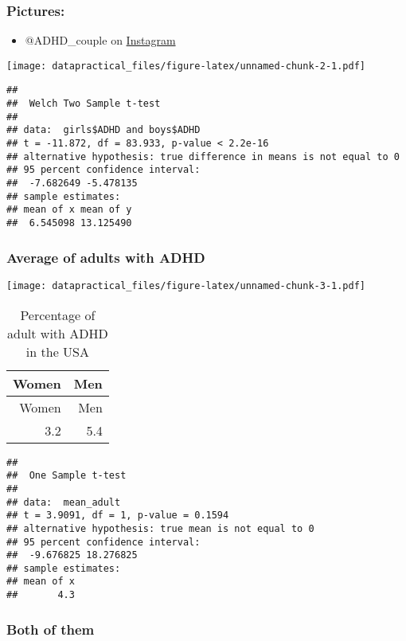 \documentclass[
]{article}
\providecommand{\tightlist}{%
  \setlength{\itemsep}{0pt}\setlength{\parskip}{0pt}}
\begin{document}
\hypertarget{pictures}{%
\subsubsection{Pictures:}\label{pictures}}

\begin{itemize}
\tightlist
\item
  @ADHD\_couple on
  \href{https://www.instagram.com/p/CF7aB2NDL3j/?hl=f}{Instagram}
\end{itemize}

\texttt{[image: datapractical\_files/figure-latex/unnamed-chunk-2-1.pdf]}

\begin{verbatim}
## 
##  Welch Two Sample t-test
## 
## data:  girls$ADHD and boys$ADHD
## t = -11.872, df = 83.933, p-value < 2.2e-16
## alternative hypothesis: true difference in means is not equal to 0
## 95 percent confidence interval:
##  -7.682649 -5.478135
## sample estimates:
## mean of x mean of y 
##  6.545098 13.125490
\end{verbatim}

\hypertarget{average-of-adults-with-adhd}{%
\subsubsection{Average of adults with
ADHD}\label{average-of-adults-with-adhd}}

\texttt{[image: datapractical\_files/figure-latex/unnamed-chunk-3-1.pdf]}

\begin{longtable}[]{@{}rr@{}}
\caption{Percentage of adult with ADHD in the USA}\tabularnewline
\toprule()
Women & Men \\
\midrule()
\endfirsthead
\toprule()
Women & Men \\
\midrule()
\endhead
3.2 & 5.4 \\
\bottomrule()
\end{longtable}

\begin{verbatim}
## 
##  One Sample t-test
## 
## data:  mean_adult
## t = 3.9091, df = 1, p-value = 0.1594
## alternative hypothesis: true mean is not equal to 0
## 95 percent confidence interval:
##  -9.676825 18.276825
## sample estimates:
## mean of x 
##       4.3
\end{verbatim}

\hypertarget{both-of-them}{%
\subsubsection{Both of them}\label{both-of-them}}
\end{document}
